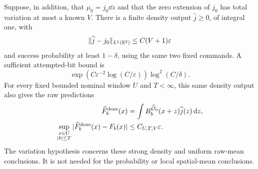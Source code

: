 \begin{corollary}
\label{cor:two-field-finite-density}
Suppose, in addition, that $\mu_0=j_0\dd z$ and that the zero
extension of $j_0$ has total variation at most a known $V$.
There is a finite density output $\widehat j\ge0$, of integral one,
with
\[
                    \|\widehat j-j_0\|_{L^1(\mathbb R^2)}
                                    \le C(V+1)\varepsilon
\]
and success probability at least $1-\delta$, using the same two
fixed commands.  A sufficient attempted-bit bound is
\begin{equation}\label{eq:two-field-BV-density-cost}
 \exp\!\left(C\varepsilon^{-2}\log(C/\varepsilon)\right)
                                  \log^2(C/\delta).
\end{equation}
For every fixed bounded nominal window $U$ and $T<\infty$, this
same density output also gives the raw predictions
\begin{align}
 \widehat F_b^{\rm dens}(x)
   &=\int B_b^{\widehat{\mathcal O}_0}(x+z)
                                  \widehat j(z)\,\mathrm d z,
                       \label{eq:two-field-density-prediction}\\
 \sup_{\substack{x\in U\\ |b|\le T}}
      |\widehat F_b^{\rm dens}(x)-F_b(x)|
   &\le C_{U,T,V}\varepsilon.
                       \label{eq:two-field-uniform-prediction}
\end{align}
The variation hypothesis concerns these strong density and uniform
raw-mean conclusions.  It is not needed for the probability or
local spatial-mean conclusions.
\end{corollary}
